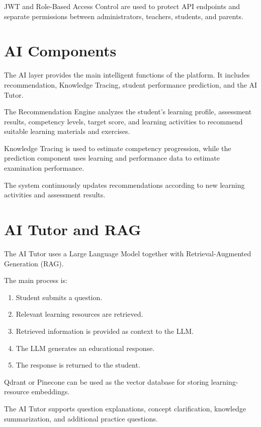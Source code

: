 \documentclass[12pt,a4paper]{report}
\begin{document}
JWT and Role-Based Access Control are used to protect API endpoints
and separate permissions between administrators, teachers, students,
and parents.


\section{AI Components}

The AI layer provides the main intelligent functions of the platform.
It includes recommendation, Knowledge Tracing, student performance
prediction, and the AI Tutor.

The Recommendation Engine analyzes the student's learning profile,
assessment results, competency levels, target score, and learning
activities to recommend suitable learning materials and exercises.

Knowledge Tracing is used to estimate competency progression, while
the prediction component uses learning and performance data to
estimate examination performance.

The system continuously updates recommendations according to new
learning activities and assessment results.


\section{AI Tutor and RAG}

The AI Tutor uses a Large Language Model together with
Retrieval-Augmented Generation (RAG).

The main process is:

\begin{enumerate}
	\item Student submits a question.
	\item Relevant learning resources are retrieved.
	\item Retrieved information is provided as context to the LLM.
	\item The LLM generates an educational response.
	\item The response is returned to the student.
\end{enumerate}

Qdrant or Pinecone can be used as the vector database for storing
learning-resource embeddings.

The AI Tutor supports question explanations, concept clarification,
knowledge summarization, and additional practice questions.
\end{document}
